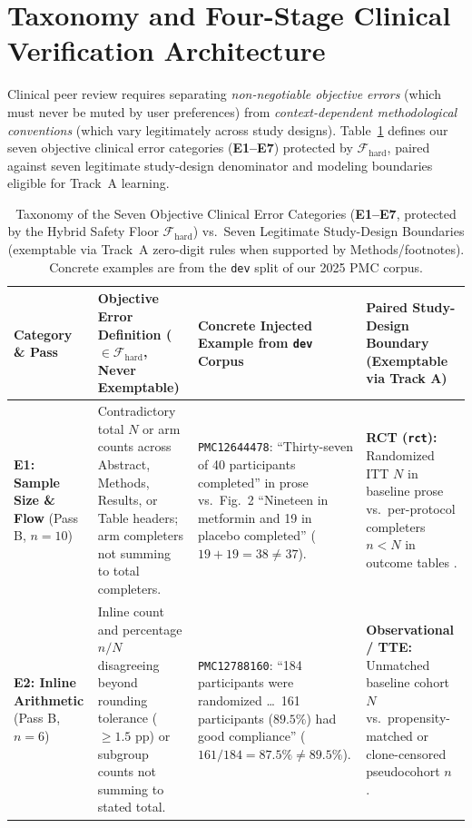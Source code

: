 \documentclass[11pt,a4paper]{article}
\begin{document}
\section{Taxonomy and Four-Stage Clinical Verification Architecture}
\label{sec:pipeline}

Clinical peer review requires separating \emph{non-negotiable objective errors} (which must never be muted by user preferences) from \emph{context-dependent methodological conventions} (which vary legitimately across study designs). Table~\ref{tab:taxonomy} defines our seven objective clinical error categories (\textbf{E1--E7}) protected by $\mathcal{F}_{\text{hard}}$, paired against seven legitimate study-design denominator and modeling boundaries eligible for Track~A learning.

\begin{table}[!t]
\centering
\caption{Taxonomy of the Seven Objective Clinical Error Categories (\textbf{E1--E7}, protected by the Hybrid Safety Floor $\mathcal{F}_{\text{hard}}$) vs.\ Seven Legitimate Study-Design Boundaries (exemptable via Track~A zero-digit rules when supported by Methods/footnotes). Concrete examples are from the \texttt{dev} split of our 2025 PMC corpus.}
\label{tab:taxonomy}
\vspace{2pt}
\scriptsize
\setlength{\tabcolsep}{3.8pt}
\begin{tabularx}{\textwidth}{@{}>{\raggedright\arraybackslash}p{2.25cm}>{\raggedright\arraybackslash}p{4.25cm}>{\raggedright\arraybackslash}X>{\raggedright\arraybackslash}p{3.85cm}@{}}
\toprule
\textbf{Category \& Pass} & \textbf{Objective Error Definition ($\in \mathcal{F}_{\text{hard}}$, Never Exemptable)} & \textbf{Concrete Injected Example from \texttt{dev} Corpus} & \textbf{Paired Study-Design Boundary (Exemptable via Track A)} \\
\midrule
\textbf{E1: Sample Size \& Flow} (Pass B, $n=10$) & Contradictory total $N$ or arm counts across Abstract, Methods, Results, or Table headers; arm completers not summing to total completers. & \texttt{PMC12644478}: ``Thirty-seven of 40 participants completed'' in prose vs.\ Fig.~2 ``Nineteen in metformin and 19 in placebo completed'' ($19+19=38 \neq 37$). & \textbf{RCT (\texttt{rct}):} Randomized ITT $N$ in baseline prose vs.\ per-protocol completers $n < N$ in outcome tables \cite{schulz2010consort}. \\
\addlinespace[2.5pt]
\textbf{E2: Inline Arithmetic} (Pass B, $n=6$) & Inline count and percentage $n/N$ disagreeing beyond rounding tolerance ($\ge 1.5\text{ pp}$) or subgroup counts not summing to stated total. & \texttt{PMC12788160}: ``184 participants were randomized \dots\ 161 participants ($89.5\%$) had good compliance'' ($161/184 = 87.5\% \neq 89.5\%$). & \textbf{Observational / TTE:} Unmatched baseline cohort $N$ vs.\ propensity-matched or clone-censored pseudocohort $n$ \cite{vandenbroucke2007strobe}. \\

\end{tabularx}
\end{table}
\end{document}
